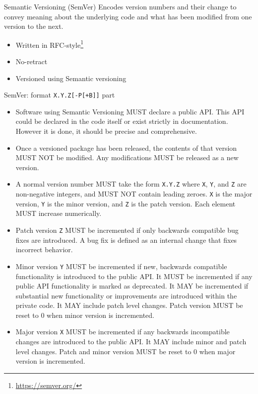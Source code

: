 \documentclass[presentation]{beamer}
\newcommand{\fnurl}[1]{\footnote{\url{#1}}}
\begin{document}
\begin{frame}{Semantic Versioning (SemVer)}
    Encodes version numbers and their change to convey meaning about the underlying code and what has been modified from one version to the next.
    \begin{itemize}
        \item Written in RFC-style\fnurl{https://semver.org/}
        \item No-retract
        \item Versioned using Semantic versioning
    \end{itemize}
\end{frame}
\begin{frame}[allowframebreaks]{SemVer: format \texttt{X.Y.Z[-P[+B]]} part}
    \begin{itemize}
        \item Software using Semantic Versioning MUST declare a public API. This API could be declared in the code itself or exist strictly in documentation. However it is done, it should be precise and comprehensive.
        \item Once a versioned package has been released, the contents of that version MUST NOT be modified. Any modifications MUST be released as a new version.
        \item A normal version number MUST take the form \texttt{X.Y.Z} where \texttt{X}, \texttt{Y}, and \texttt{Z} are non-negative integers, and MUST NOT contain leading zeroes. \texttt{X} is the major version, \texttt{Y} is the minor version, and \texttt{Z} is the patch version. Each element MUST increase numerically.
        \item Patch version \texttt{Z} MUST be incremented if only backwards compatible bug fixes are introduced. A bug fix is defined as an internal change that fixes incorrect behavior.
        \item Minor version \texttt{Y} MUST be incremented if new, backwards compatible functionality is introduced to the public API. It MUST be incremented if any public API functionality is marked as deprecated. It MAY be incremented if substantial new functionality or improvements are introduced within the private code. It MAY include patch level changes. Patch version MUST be reset to 0 when minor version is incremented.
        \item Major version \texttt{X} MUST be incremented if any backwards incompatible changes are introduced to the public API. It MAY include minor and patch level changes. Patch and minor version MUST be reset to 0 when major version is incremented.

\end{itemize}
\end{frame}
\end{document}
